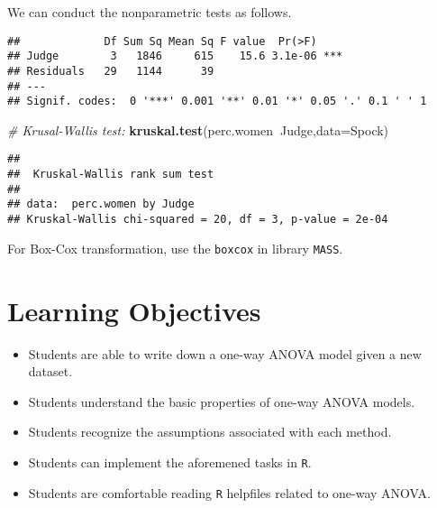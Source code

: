 \documentclass[12pt,]{book}
\newenvironment{Shaded}{\begin{snugshade}}{\end{snugshade}}
\newcommand{\KeywordTok}[1]{\textcolor[rgb]{0.13,0.29,0.53}{\textbf{#1}}}
\newcommand{\DataTypeTok}[1]{\textcolor[rgb]{0.13,0.29,0.53}{#1}}
\newcommand{\CommentTok}[1]{\textcolor[rgb]{0.56,0.35,0.01}{\textit{#1}}}
\newcommand{\OperatorTok}[1]{\textcolor[rgb]{0.81,0.36,0.00}{\textbf{#1}}}
\newcommand{\NormalTok}[1]{#1}
\providecommand{\tightlist}{%
  \setlength{\itemsep}{0pt}\setlength{\parskip}{0pt}}
\begin{document}
We can conduct the nonparametric tests as follows.

\begin{Shaded}
\end{Shaded}

\begin{verbatim}
##             Df Sum Sq Mean Sq F value  Pr(>F)    
## Judge        3   1846     615    15.6 3.1e-06 ***
## Residuals   29   1144      39                    
## ---
## Signif. codes:  0 '***' 0.001 '**' 0.01 '*' 0.05 '.' 0.1 ' ' 1
\end{verbatim}

\begin{Shaded}
\begin{Highlighting}[]
\CommentTok{# Krusal-Wallis test:}
\KeywordTok{kruskal.test}\NormalTok{(perc.women}\OperatorTok{~}\NormalTok{Judge,}\DataTypeTok{data=}\NormalTok{Spock)}
\end{Highlighting}
\end{Shaded}

\begin{verbatim}
## 
##  Kruskal-Wallis rank sum test
## 
## data:  perc.women by Judge
## Kruskal-Wallis chi-squared = 20, df = 3, p-value = 2e-04
\end{verbatim}

For Box-Cox transformation, use the \texttt{boxcox} in library
\texttt{MASS}.

\section{Learning Objectives}\label{learning-objectives-1}

\begin{itemize}
\tightlist
\item
  Students are able to write down a one-way ANOVA model given a new
  dataset.
\item
  Students understand the basic properties of one-way ANOVA models.
\item
  Students recognize the assumptions associated with each method.
\item
  Students can implement the aforemened tasks in \texttt{R}.
\item
  Students are comfortable reading \texttt{R} helpfiles related to
  one-way ANOVA.
\end{itemize}
\end{document}
